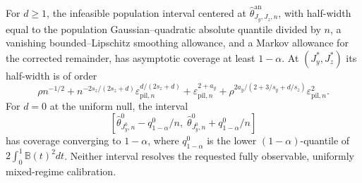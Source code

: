For \(d\ge1\), the infeasible population interval centered at \(\widehat\theta^{\mathrm{an}}_{J_y,J_z,n}\), with half-width equal to the population Gaussian--quadratic absolute quantile divided by \(n\), a vanishing bounded--Lipschitz smoothing allowance, and a Markov allowance for the corrected remainder, has asymptotic coverage at least \(1-\alpha\).  At \((J_y^*,J_z^*)\) its half-width is of order \[\rho n^{-1/2}+n^{-2s_z/(2s_z+d)}\varepsilon_{\mathrm{pil},n}^{d/(2s_z+d)}+\varepsilon_{\mathrm{pil},n}^{2+a_y}+\rho^{2a_y/(2+3/s_y+d/s_z)}\varepsilon_{\mathrm{pil},n}^2.\] For \(d=0\) at the uniform null, the interval \[\left[\widehat\theta^0_{J_y^0,n}-q^0_{1-\alpha}/n,\;\widehat\theta^0_{J_y^0,n}+q^0_{1-\alpha}/n\right]\] has coverage converging to \(1-\alpha\), where \(q^0_{1-\alpha}\) is the lower \((1-\alpha)\)-quantile of \(2\int_0^1\mathbb B(t)^2dt\).  Neither interval resolves the requested fully observable, uniformly mixed-regime calibration.